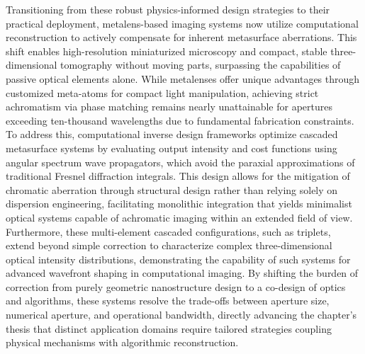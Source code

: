 \documentclass[11pt]{article}
\begin{document}
Transitioning from these robust physics-informed design strategies to their practical deployment, metalens-based imaging systems now utilize computational reconstruction to actively compensate for inherent metasurface aberrations. This shift enables high-resolution miniaturized microscopy and compact, stable three-dimensional tomography without moving parts, surpassing the capabilities of passive optical elements alone. While metalenses offer unique advantages through customized meta-atoms for compact light manipulation, achieving strict achromatism via phase matching remains nearly unattainable for apertures exceeding ten-thousand wavelengths due to fundamental fabrication constraints. To address this, computational inverse design frameworks optimize cascaded metasurface systems by evaluating output intensity and cost functions using angular spectrum wave propagators, which avoid the paraxial approximations of traditional Fresnel diffraction integrals. \citep{doi_10_1364_oe_448757_33bdf93c} \citep{doi_10_1002_lpor_202401011_3926c17d} This design allows for the mitigation of chromatic aberration through structural design rather than relying solely on dispersion engineering, facilitating monolithic integration that yields minimalist optical systems capable of achromatic imaging within an extended field of view. Furthermore, these multi-element cascaded configurations, such as triplets, extend beyond simple correction to characterize complex three-dimensional optical intensity distributions, demonstrating the capability of such systems for advanced wavefront shaping in computational imaging. By shifting the burden of correction from purely geometric nanostructure design to a co-design of optics and algorithms, these systems resolve the trade-offs between aperture size, numerical aperture, and operational bandwidth, directly advancing the chapter's thesis that distinct application domains require tailored strategies coupling physical mechanisms with algorithmic reconstruction. \citep{doi_10_3788_pi_2023_c01_9f71817a} \citep{doi_10_1364_oe_27_030308_704a1c9b} \citep{doi_10_1038_s41377_026_02272_y_42e58df2}
\end{document}
